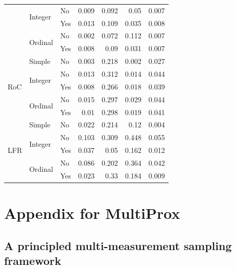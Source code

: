 \begin{table}[H]
\begin{adjustbox}{width=\textwidth}
\begin{tabular}{lllrrrr}
 & \multirow[t]{2}{*}{Integer} & No & 0.009 & 0.092 & 0.05 & 0.007 \\
 &  & Yes & 0.013 & 0.109 & 0.035 & 0.008 \\
 & \multirow[t]{2}{*}{Ordinal} & No & 0.002 & 0.072 & 0.112 & 0.007 \\
 &  & Yes & 0.008 & 0.09 & 0.031 & 0.007 \\
\midrule
\multirow[t]{5}{*}{RoC} & Simple & No & 0.003 & 0.218 & 0.002 & 0.027 \\
 & \multirow[t]{2}{*}{Integer} & No & 0.013 & 0.312 & 0.014 & 0.044 \\
 &  & Yes & 0.008 & 0.266 & 0.018 & 0.039 \\
 & \multirow[t]{2}{*}{Ordinal} & No & 0.015 & 0.297 & 0.029 & 0.044 \\
 &  & Yes & 0.01 & 0.298 & 0.019 & 0.041 \\
\midrule
\multirow[t]{5}{*}{LFR} & Simple & No & 0.022 & 0.214 & 0.12 & 0.004 \\
 & \multirow[t]{2}{*}{Integer} & No & 0.103 & 0.309 & 0.448 & 0.055 \\
 &  & Yes & 0.037 & 0.05 & 0.162 & 0.012 \\
 & \multirow[t]{2}{*}{Ordinal} & No & 0.086 & 0.202 & 0.364 & 0.042 \\
 &  & Yes & 0.023 & 0.33 & 0.184 & 0.009 \\
\bottomrule
\end{tabular}
\end{adjustbox}
\end{table}

\chapter{Appendix for MultiProx}

\section{A principled multi-measurement sampling framework}
\label{sec:appendix_gibbs}
